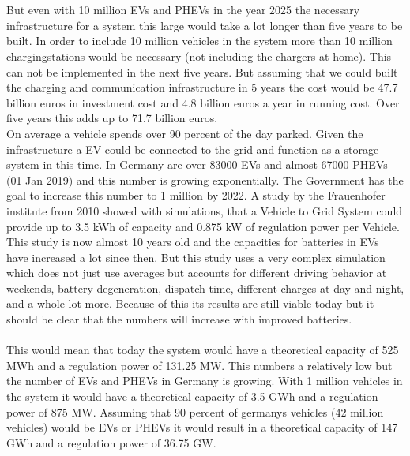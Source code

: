 \documentclass[12pt,a4paper]{article}
\begin{document}
\begin{parcolumns}[colwidths={1=2.5 cm, 2=10 cm, 3=2.5cm}]{3}
{\\ \\
But even with 10 million EVs and PHEVs in the year 2025 the necessary infrastructure for a system this large would take a lot longer than five years to be built. In order to include 10 million vehicles in the system more than 10 million chargingstations would be necessary (not including the chargers at home). This can not be implemented in the next five years. But assuming that we could built the charging and communication infrastructure in 5 years the cost would be 47.7 billion euros in investment cost and 4.8 billion euros a year in running cost. Over five years this adds up to 71.7 billion euros.\\
\clearpage
\noindent
On average a vehicle spends over 90 percent of the day parked. Given the infrastructure a EV could be connected to the grid and function as a storage system in this time. In Germany are over 83000 EVs and almost 67000 PHEVs (01 Jan 2019)
and this number is growing exponentially. The Government has the goal to increase this number to 1 million by 2022.
A study by the Frauenhofer institute from 2010 showed with simulations, that a Vehicle to Grid System could provide up to 3.5 kWh of capacity and 0.875 kW of regulation power per Vehicle. This study is now almost 10 years old and the capacities for batteries in EVs have increased a lot since then. But this study uses a very complex simulation which does not just use averages but accounts for different driving behavior at weekends, battery degeneration, dispatch time, different charges at day and night, and a whole lot more. Because of this its results are still viable today but it should be clear that the numbers will increase with improved batteries.
\\ \\
This would mean that today the system would have a theoretical capacity of 525 MWh and a regulation power of 131.25 MW. This numbers a relatively low but the number of EVs and PHEVs in Germany is growing. With 1 million vehicles in the system it would have a theoretical capacity of 3.5 GWh and a regulation power of 875 MW. Assuming that 90 percent of germanys vehicles (42 million vehicles) would be EVs or PHEVs it would result in a theoretical capacity of 147 GWh and a regulation power of 36.75 GW.
\\ \\
}
\end{parcolumns}
\end{document}
